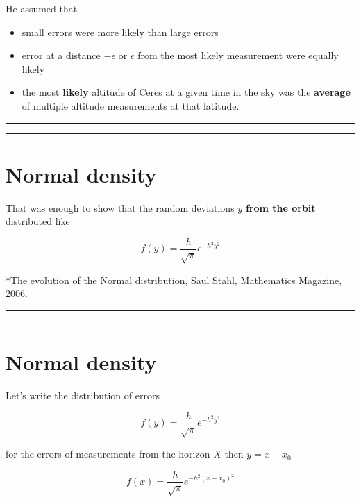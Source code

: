 \documentclass[
]{book}
\providecommand{\tightlist}{%
  \setlength{\itemsep}{0pt}\setlength{\parskip}{0pt}}
\begin{document}
He assumed that

\begin{itemize}
\tightlist
\item
  small errors were more likely than large errors
\item
  error at a distance \(-\epsilon\) or \(\epsilon\) from the most likely measurement were equally likely
\item
  the most \textbf{likely} altitude of Ceres at a given time in the sky was the \textbf{average} of multiple altitude measurements at that latitude.
\end{itemize}

\begin{center}\rule{0.5\linewidth}{0.5pt}\end{center}

\begin{center}\rule{0.5\linewidth}{0.5pt}\end{center}

\hypertarget{normal-density-3}{%
\section{Normal density}\label{normal-density-3}}

That was enough to show that the random deviations \(y\) \textbf{from the orbit} distributed like

\[f(y)=\frac{h}{\sqrt{\pi}}e^{-h^2y^2}\]

*The evolution of the Normal distribution, Saul Stahl, Mathematics Magazine, 2006.

\begin{center}\rule{0.5\linewidth}{0.5pt}\end{center}

\begin{center}\rule{0.5\linewidth}{0.5pt}\end{center}

\hypertarget{normal-density-4}{%
\section{Normal density}\label{normal-density-4}}

Let's write the distribution of errors

\[f(y)=\frac{h}{\sqrt{\pi}}e^{-h^2y^2}\]

for the errors of measurements from the horizon \(X\) then \(y=x-x_0\)

\[f(x)=\frac{h}{\sqrt{\pi}}e^{-h^2(x-x_0)^2}\]
\end{document}
